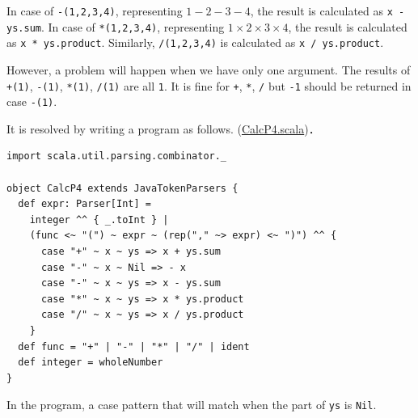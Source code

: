 \documentclass[11pt]{article}
\begin{document}
In case of \texttt{-(1,2,3,4)}, representing \(1-2-3-4\), 
the result is calculated as \texttt{x - ys.sum}. 
In case of \texttt{*(1,2,3,4)}, representing \(1\times 2\times 3\times 4\), 
the result is calculated as \texttt{x * ys.product}.
Similarly, \texttt{/(1,2,3,4)} is calculated as \texttt{x / ys.product}.

However, a problem will happen when we have only one argument.
The results of \texttt{+(1)}, \texttt{-(1)}, \texttt{*(1)}, \texttt{/(1)} are all \texttt{1}.
It is fine for \texttt{+}, \texttt{*}, \texttt{/} but \texttt{-1} should be returned in case \texttt{-(1)}.

It is resolved by writing a program as follows. 
(\href{prog/parser/CalcP4.scala}{CalcP4.scala})．

\begin{verbatim}
import scala.util.parsing.combinator._

object CalcP4 extends JavaTokenParsers {
  def expr: Parser[Int] =
    integer ^^ { _.toInt } |
    (func <~ "(") ~ expr ~ (rep("," ~> expr) <~ ")") ^^ {
      case "+" ~ x ~ ys => x + ys.sum
      case "-" ~ x ~ Nil => - x
      case "-" ~ x ~ ys => x - ys.sum
      case "*" ~ x ~ ys => x * ys.product
      case "/" ~ x ~ ys => x / ys.product
    }
  def func = "+" | "-" | "*" | "/" | ident
  def integer = wholeNumber
}
\end{verbatim}

In the program, a case pattern that will match when the part of \texttt{ys} is \texttt{Nil}.
\end{document}
